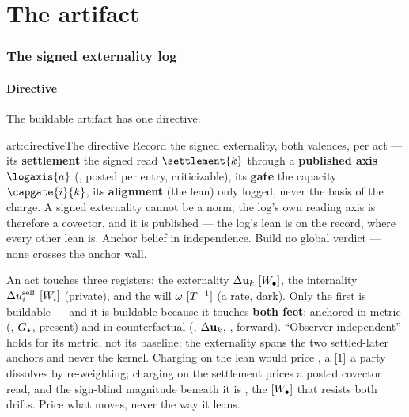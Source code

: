 \documentclass[../main]{subfiles}
\begin{document}
\clearpage
\part{The artifact}

\section{The signed externality log}
\label{sec:artifact}

\subsection{Directive}
\label{subsec:artifact:directive}
%
%
The buildable artifact has one directive.
\begin{statement}{art:directive}{The directive}
  Record the signed externality, both valences, per act --- its \textbf{settlement}
  the signed read $\settlement{k}$ through a \textbf{published axis}
  $\logaxis{a}$ (, posted per entry, criticizable), its \textbf{gate} the
  capacity $\capgate{i}{k}$, its \textbf{alignment} (the lean) only logged, never the
  basis of the charge. A signed externality cannot be a norm; the log's own reading
  axis is therefore a covector, and it is published --- the log's lean is on the
  record, where every other lean is. Anchor belief in independence. Build no global
  verdict --- none crosses the anchor wall.
\end{statement}

An act touches three registers: the externality $\Delta\mathbf{u}\sb{k}\ [W\sb{\bullet}]$, the internality
$\Delta\extself{i}\ \dimnodewelfare{i}$ (private), and the will $\omega\ [T\sp{-1}]$ (a rate, dark). Only
the first is buildable --- and it is buildable because it touches \textbf{both feet}: anchored
in metric (, $G\sb{\star}$, present) and in counterfactual
(, $\Delta\mathbf{u}\sb{k}$, , forward). ``Observer-independent''
holds for its metric, not its baseline; the externality spans the two settled-later anchors
and never the kernel. Charging on the lean would price , a $[1]$ a party
dissolves by re-weighting; charging on the settlement prices a posted covector read,
and the sign-blind magnitude beneath it is , the $[W\sb{\bullet}]$ that
resists both drifts. Price what moves, never the way it leans.
\end{document}
